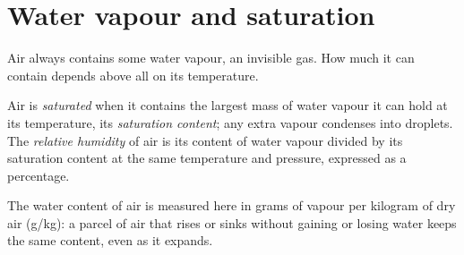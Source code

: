 \section{Water vapour and saturation}

Air always contains some water vapour, an invisible gas. How much it can
contain depends above all on its temperature.

\begin{definition}\label{def:g10:why-clouds-form:humidity}
Air is \emph{saturated} when it contains the largest mass
of water vapour it can hold at its temperature, its \emph{saturation
content}; any extra vapour condenses into droplets. The \emph{relative
humidity} of air is its content of water vapour
divided by its saturation content at the same temperature and pressure,
expressed as a percentage.
\end{definition}

The water content of air is measured here in grams of vapour per kilogram
of dry air (\unit{g/kg}): a parcel of air that rises or sinks without
gaining or losing water keeps the same content, even as it expands.

